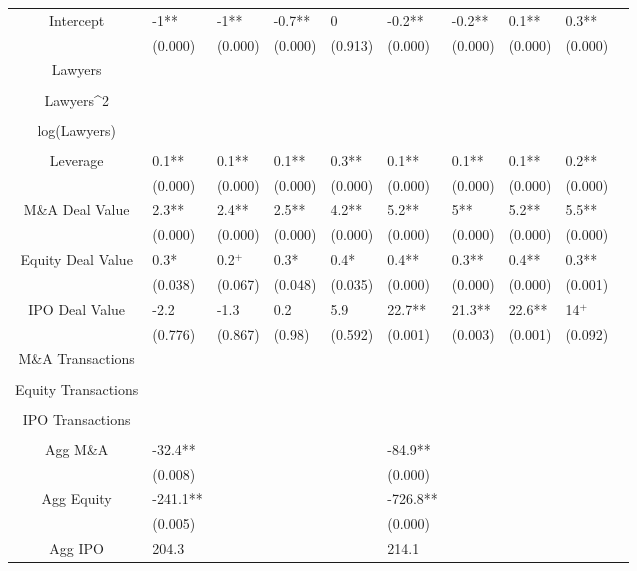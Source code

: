 \documentclass{article}
\begin{document}
\begin{table}[H]
\begin{tabular}{|clllllllll|}
Intercept & -1** & -1** & -0.7** & 0 & -0.2** & -0.2** & 0.1** & 0.3** & \\ 
   & (0.000) & (0.000) & (0.000) & (0.913) & (0.000) & (0.000) & (0.000) & (0.000) & \\ 
  Lawyers &  &  &  &  &  &  &  &  & \\ 
   &  &  &  &  &  &  &  &  & \\ 
  Lawyers^2 &  &  &  &  &  &  &  &  & \\ 
   &  &  &  &  &  &  &  &  & \\ 
  log(Lawyers) &  &  &  &  &  &  &  &  & \\ 
   &  &  &  &  &  &  &  &  & \\ 
  Leverage & 0.1** & 0.1** & 0.1** & 0.3** & 0.1** & 0.1** & 0.1** & 0.2** & \\ 
   & (0.000) & (0.000) & (0.000) & (0.000) & (0.000) & (0.000) & (0.000) & (0.000) & \\ 
  M\&A Deal Value & 2.3** & 2.4** & 2.5** & 4.2** & 5.2** & 5** & 5.2** & 5.5** & \\ 
   & (0.000) & (0.000) & (0.000) & (0.000) & (0.000) & (0.000) & (0.000) & (0.000) & \\ 
  Equity Deal Value & 0.3* & 0.2$^{+}$ & 0.3* & 0.4* & 0.4** & 0.3** & 0.4** & 0.3** & \\ 
   & (0.038) & (0.067) & (0.048) & (0.035) & (0.000) & (0.000) & (0.000) & (0.001) & \\ 
  IPO Deal Value & -2.2 & -1.3 & 0.2 & 5.9 & 22.7** & 21.3** & 22.6** & 14$^{+}$ & \\ 
   & (0.776) & (0.867) & (0.98) & (0.592) & (0.001) & (0.003) & (0.001) & (0.092) & \\ 
  M\&A Transactions &  &  &  &  &  &  &  &  & \\ 
   &  &  &  &  &  &  &  &  & \\ 
  Equity Transactions &  &  &  &  &  &  &  &  & \\ 
   &  &  &  &  &  &  &  &  & \\ 
  IPO Transactions &  &  &  &  &  &  &  &  & \\ 
   &  &  &  &  &  &  &  &  & \\ 
  Agg M\&A & -32.4** &  &  &  & -84.9** &  &  &  & \\ 
   & (0.008) &  &  &  & (0.000) &  &  &  & \\ 
  Agg Equity & -241.1** &  &  &  & -726.8** &  &  &  & \\ 
   & (0.005) &  &  &  & (0.000) &  &  &  & \\ 
  Agg IPO & 204.3 &  &  &  & 214.1 &  &  &  & \\ 

\end{tabular}
\end{table}
\end{document}
